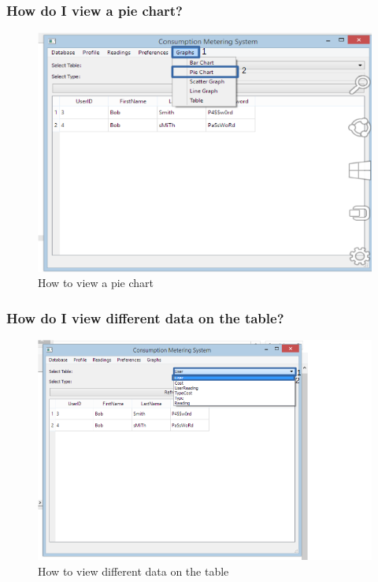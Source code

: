 \subsubsection{How do I view a pie chart?}\label{question:pie_chart}
\begin{figure}[H]
	\includegraphics{./manual/images/display_pie_chart.png}
	\caption{How to view a pie chart}
\end{figure}

\subsubsection{How do I view different data on the table?}\label{question:update_table}
\begin{figure}[H]
	\includegraphics{./manual/images/update_table.png}
	\caption{How to view different data on the table}
\end{figure}

